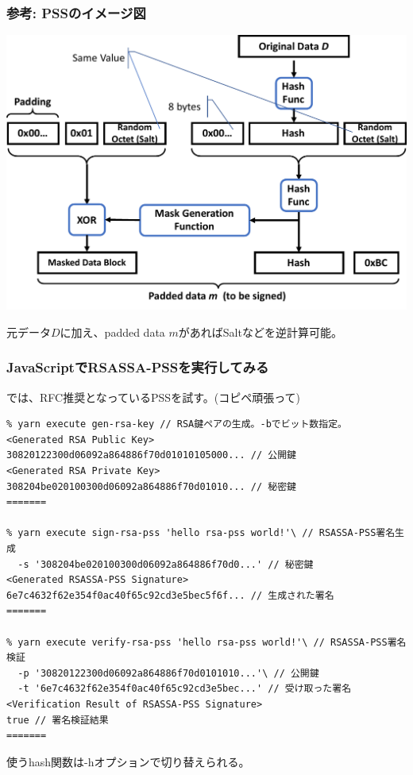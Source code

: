 \documentclass[12pt,dvipdfmx]{beamer}
\begin{document}
\begin{frame}
\frametitle{参考: PSSのイメージ図}
\begin{center}
\includegraphics[width=0.8\linewidth]{Figs/pss.pdf}
\end{center}
元データ$D$に加え、padded data $m$があればSaltなどを逆計算可能。
\end{frame}


\begin{frame}[fragile]
\frametitle{JavaScriptでRSASSA-PSSを実行してみる}
では、RFC推奨となっているPSSを試す。(コピペ頑張って)
\begin{exampleblock}{}
\scriptsize
\begin{verbatim}
% yarn execute gen-rsa-key // RSA鍵ペアの生成。-bでビット数指定。
<Generated RSA Public Key>
30820122300d06092a864886f70d01010105000... // 公開鍵
<Generated RSA Private Key>
308204be020100300d06092a864886f70d01010... // 秘密鍵
=======

% yarn execute sign-rsa-pss 'hello rsa-pss world!'\ // RSASSA-PSS署名生成
  -s '308204be020100300d06092a864886f70d0...' // 秘密鍵
<Generated RSASSA-PSS Signature>
6e7c4632f62e354f0ac40f65c92cd3e5bec5f6f... // 生成された署名
=======

% yarn execute verify-rsa-pss 'hello rsa-pss world!'\ // RSASSA-PSS署名検証
  -p '30820122300d06092a864886f70d0101010...'\ // 公開鍵
  -t '6e7c4632f62e354f0ac40f65c92cd3e5bec...' // 受け取った署名
<Verification Result of RSASSA-PSS Signature>
true // 署名検証結果
=======
\end{verbatim}
\end{exampleblock}
使うhash関数は-hオプションで切り替えられる。

\end{frame}
\end{document}
